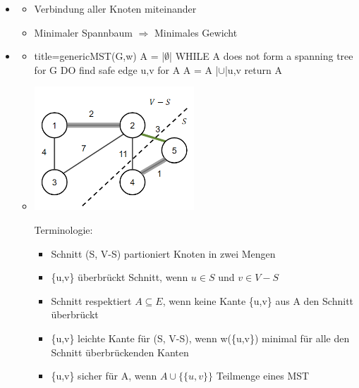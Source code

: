 \documentclass[
    12pt,
    a4paper,
    ngerman,
    color=3b,%
    marginpar=false,
    colorback=false,
    leqno,
]{tudaexercise}
\begin{document}
    \begin{itemize}
        \item {}
            \begin{itemize}
                \item Verbindung aller Knoten miteinander
                \item Minimaler Spannbaum $\Rightarrow$ Minimales Gewicht
            \end{itemize}

        \item {}
            \begin{itemize}
                \item[]
                    \begin{ccode}[autogobble,escapeinside=||]{title={genericMST(G,w)}}
                    A = |$\emptyset$|
                    WHILE A does not form a spanning tree for G DO
                        find safe edge {u,v} for A
                        A = A |$\cup$|{{u,v}}
                    return A
                    \end{ccode}
                \item[]
                    \begin{minipage}{0.35\textwidth}
                        \includegraphics[width=6cm]{pictures/mstTerm.PNG}
                    \end{minipage}
                    \begin{minipage}{0.55\textwidth}
                        Terminologie:
                            \begin{itemize}
                                \item Schnitt (S, V-S) partioniert Knoten in zwei Mengen
                                \item \{u,v\} überbrückt Schnitt, wenn $u \in S$ und $v \in V-S$
                                \item Schnitt respektiert $A \subseteq E$, wenn keine Kante \{u,v\} aus A den Schnitt überbrückt
                                \item \{u,v\} leichte Kante für (S, V-S), wenn w(\{u,v\}) minimal für alle den Schnitt überbrückenden Kanten
                                \item \{u,v\} sicher für A, wenn $A \cup \{\{u,v\}\}$ Teilmenge eines MST
                            \end{itemize}
                    \end{minipage}
            \end{itemize}
        

\end{itemize}
\end{document}
